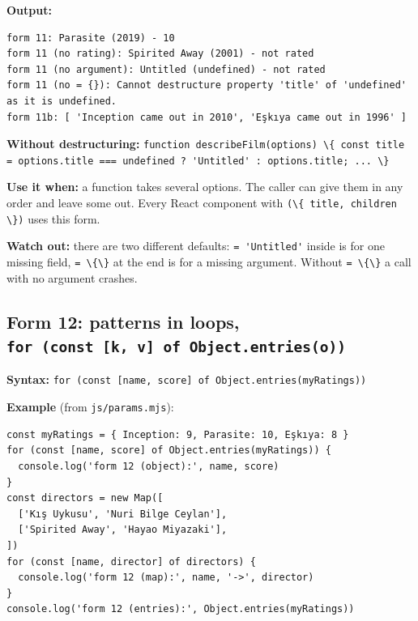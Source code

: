 \documentclass[
]{article}
\newcommand{\passthrough}[1]{#1}
\begin{document}
\textbf{Output:}

\begin{lstlisting}
form 11: Parasite (2019) - 10
form 11 (no rating): Spirited Away (2001) - not rated
form 11 (no argument): Untitled (undefined) - not rated
form 11 (no = {}): Cannot destructure property 'title' of 'undefined' as it is undefined.
form 11b: [ 'Inception came out in 2010', 'Eşkıya came out in 1996' ]
\end{lstlisting}

\textbf{Without destructuring:}
\passthrough{\lstinline!function describeFilm(options) \{ const title = options.title === undefined ? 'Untitled' : options.title; ... \}!}

\textbf{Use it when:} a function takes several options. The caller can
give them in any order and leave some out. Every React component with
\passthrough{\lstinline!(\{ title, children \})!} uses this form.

\textbf{Watch out:} there are two different defaults:
\passthrough{\lstinline!= 'Untitled'!} inside is for one missing field,
\passthrough{\lstinline!= \{\}!} at the end is for a missing argument.
Without \passthrough{\lstinline!= \{\}!} a call with no argument
crashes.

\hypertarget{form-12-patterns-in-loops-for-const-k-v-of-object.entrieso}{%
\subsection{\texorpdfstring{Form 12: patterns in loops,
\texttt{for\ (const\ {[}k,\ v{]}\ of\ Object.entries(o))}}{Form 12: patterns in loops, for (const {[}k, v{]} of Object.entries(o))}}\label{form-12-patterns-in-loops-for-const-k-v-of-object.entrieso}}

\textbf{Syntax:}
\passthrough{\lstinline!for (const [name, score] of Object.entries(myRatings))!}

\textbf{Example} (from \passthrough{\lstinline!js/params.mjs!}):

\begin{lstlisting}
const myRatings = { Inception: 9, Parasite: 10, Eşkıya: 8 }
for (const [name, score] of Object.entries(myRatings)) {
  console.log('form 12 (object):', name, score)
}
const directors = new Map([
  ['Kış Uykusu', 'Nuri Bilge Ceylan'],
  ['Spirited Away', 'Hayao Miyazaki'],
])
for (const [name, director] of directors) {
  console.log('form 12 (map):', name, '->', director)
}
console.log('form 12 (entries):', Object.entries(myRatings))
\end{lstlisting}
\end{document}
